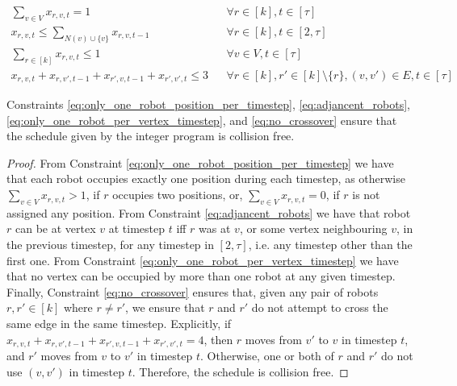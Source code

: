 \documentclass{DAC}
\begin{document}
\begin{align}
    \sum\limits_{v \in V} x_{r, v, t} = 1 & & \forall r \in [k], t \in [\tau]\label{eq:only_one_robot_position_per_timestep}\\
    x_{r, v, t} \leq \sum\limits_{N(v) \cup \{ v \}} x_{r, v, t - 1} & & \forall r \in [k], t \in [2, \tau] \label{eq:adjancent_robots}\\
    \sum\limits_{r \in [k]} x_{r, v, t} \leq 1 & & \forall v \in V, t \in [\tau]\label{eq:only_one_robot_per_vertex_timestep}\\
    x_{r, v, t} + x_{r, v', t - 1} + x_{r', v, t - 1} + x_{r', v', t} \leq 3 & & \forall r \in [k], r' \in [k] \setminus \{ r \}, (v, v') \in E, t \in [\tau] \label{eq:no_crossover}
\end{align}

\begin{lemma}
    \label{lem:collsion_free}
    Constraints \ref{eq:only_one_robot_position_per_timestep}, \ref{eq:adjancent_robots}, \ref{eq:only_one_robot_per_vertex_timestep}, and \ref{eq:no_crossover} ensure that the schedule given by the integer program is collision free.
\end{lemma}

\begin{proof}
    From Constraint \ref{eq:only_one_robot_position_per_timestep} we have that each robot occupies exactly one position during each timestep, as otherwise $\sum\limits_{v \in V} x_{r, v, t} > 1$, if $r$ occupies two positions, or, $\sum\limits_{v \in V} x_{r, v, t} = 0$, if $r$ is not assigned any position. From Constraint \ref{eq:adjancent_robots} we have that robot $r$ can be at vertex $v$ at timestep $t$ iff $r$ was at $v$, or some vertex neighbouring $v$, in the previous timestep, for any timestep in $[2, \tau]$, i.e. any timestep other than the first one. From Constraint \ref{eq:only_one_robot_per_vertex_timestep} we have that no vertex can be occupied by more than one robot at any given timestep. Finally, Constraint \ref{eq:no_crossover} ensures that, given any pair of robots $r, r' \in [k]$ where $r \neq r'$, we ensure that $r$ and $r'$ do not attempt to cross the same edge in the same timestep. Explicitly, if $ x_{r, v, t} + x_{r, v', t - 1} + x_{r', v, t - 1} + x_{r', v', t} = 4$, then $r$ moves from $v'$ to $v$ in timestep $t$, and $r'$ moves from $v$ to $v'$ in timestep $t$. Otherwise, one or both of $r$ and $r'$ do not use $(v, v')$ in timestep $t$.
    Therefore, the schedule is collision free.
\end{proof}
\end{document}
